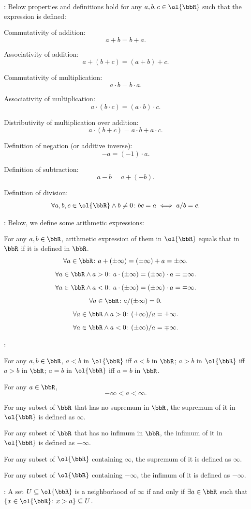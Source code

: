 \documentclass[a4paper,12pt]{article}
\begin{document}
\bit
\item {}: Below properties and definitions hold for any $a,b,c\in\ol{\bbR}$ such that the expression is defined:
\bit
\item Commutativity of addition:
\[a+b=b+a.\]
\item Associativity of addition:
\[a+(b+c)=(a+b)+c.\]
\item Commutativity of multiplication:
\[a\cdot b=b\cdot a.\]
\item Associativity of multiplication:
\[a\cdot (b\cdot c)=(a\cdot b)\cdot c.\]
\item Distributivity of multiplication over addition:
\[a\cdot (b+c)=a\cdot b+a\cdot c.\]
\item Definition of negation (or additive inverse):
\[-a=(-1)\cdot a.\]
\item Definition of subtraction:
\[a-b=a+(-b).\]
\item Definition of division:
\[\forall a,b,c\in\ol{\bbR}\land b\neq 0\colon bc=a\iff a/b=c.\]
\eit
\item {}: Below, we define some arithmetic expressions:

For any $a,b\in\bbR$, arithmetic expression of them in $\ol{\bbR}$ equals that in $\bbR$ if it is defined in $\bbR$.
\[\forall a\in\bbR\colon a+(\pm\infty)=(\pm\infty)+a=\pm\infty.\]
\[\forall a\in\bbR\land a>0\colon a\cdot(\pm\infty)=(\pm\infty)\cdot a=\pm\infty.\]
\[\forall a\in\bbR\land a<0\colon a\cdot(\pm\infty)=(\pm\infty)\cdot a=\mp\infty.\]
\[\forall a\in\bbR\colon a/(\pm\infty)=0.\]
\[\forall a\in\bbR\land a>0\colon(\pm\infty)/a=\pm\infty.\]
\[\forall a\in\bbR\land a<0\colon(\pm\infty)/a=\mp\infty.\]
\item {}:
\bit
\item For any $a,b\in\bbR$, $a<b$ in $\ol{\bbR}$ iff $a<b$ in $\bbR$; $a>b$ in $\ol{\bbR}$ iff $a>b$ in $\bbR$; $a=b$ in $\ol{\bbR}$ iff $a=b$ in $\bbR$.
\item For any $a\in\bbR$,
\[-\infty<a<\infty.\]
\item For any subset of $\bbR$ that has no supremum in $\bbR$, the supremum of it in $\ol{\bbR}$ is defined as $\infty$.

For any subset of $\bbR$ that has no infimum in $\bbR$, the infimum of it in $\ol{\bbR}$ is defined as $-\infty$.

For any subset of $\ol{\bbR}$ containing $\infty$, the supremum of it is defined as $\infty$.

For any subset of $\ol{\bbR}$ containing $-\infty$, the infimum of it is defined as $-\infty$.
\eit
\item {}: A set $U\subseteq\ol{\bbR}$ is a neighborhood of $\infty$ if and only if $\exists a\in\bbR$ such that $\{x\in\ol{\bbR}\colon x>a\}\subseteq U$.
\end{document}
